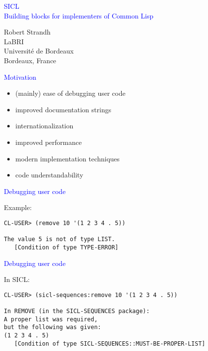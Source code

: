 \documentclass{slides}
\newcommand{\ti}[1]{\begin{center}\Large{\textcolor{blue}{#1}}\end{center}}
\begin{document}
\landscape
\setlength{\oddsidemargin}{1cm}
\setlength{\evensidemargin}{1cm}
\setlength{\marginparwidth}{1cm}
\setlength{\parskip}{0.5cm}
\setlength{\parindent}{0cm}
\begin{slide}\ti{SICL \\ Building blocks for implementers of Common Lisp}
\vskip 0.5cm
\begin{center}
Robert Strandh \\
LaBRI \\
Université de Bordeaux \\
Bordeaux, France
\end{center}
\vfill\end{slide}
\begin{slide}\ti{Motivation}
\vskip 0.5cm
\begin{itemize}
\item (mainly) ease of debugging user code
\item improved documentation strings
\item internationalization 
\item improved performance
\item modern implementation techniques
\item code understandability
\end{itemize}
\vfill\end{slide}
\begin{slide}\ti{Debugging user code}
\small
Example:
\begin{verbatim}
CL-USER> (remove 10 '(1 2 3 4 . 5))

The value 5 is not of type LIST.
   [Condition of type TYPE-ERROR]
\end{verbatim}
\vfill\end{slide}
\begin{slide}\ti{Debugging user code}
In SICL:
\small
\begin{verbatim}
CL-USER> (sicl-sequences:remove 10 '(1 2 3 4 . 5))

In REMOVE (in the SICL-SEQUENCES package):
A proper list was required,
but the following was given:
(1 2 3 4 . 5)
   [Condition of type SICL-SEQUENCES::MUST-BE-PROPER-LIST]
\end{verbatim}
\vfill\end{slide}
\end{document}
